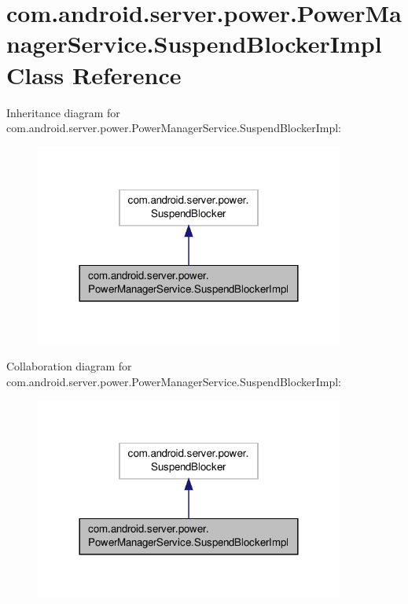 \hypertarget{classcom_1_1android_1_1server_1_1power_1_1PowerManagerService_1_1SuspendBlockerImpl}{\section{com.\-android.\-server.\-power.\-Power\-Manager\-Service.\-Suspend\-Blocker\-Impl Class Reference}
\label{classcom_1_1android_1_1server_1_1power_1_1PowerManagerService_1_1SuspendBlockerImpl}
}


Inheritance diagram for com.\-android.\-server.\-power.\-Power\-Manager\-Service.\-Suspend\-Blocker\-Impl\-:
\nopagebreak
\begin{figure}[H]
\begin{center}
\leavevmode
\includegraphics[width=288pt]{classcom_1_1android_1_1server_1_1power_1_1PowerManagerService_1_1SuspendBlockerImpl__inherit__graph}
\end{center}
\end{figure}


Collaboration diagram for com.\-android.\-server.\-power.\-Power\-Manager\-Service.\-Suspend\-Blocker\-Impl\-:
\nopagebreak
\begin{figure}[H]
\begin{center}
\leavevmode
\includegraphics[width=288pt]{classcom_1_1android_1_1server_1_1power_1_1PowerManagerService_1_1SuspendBlockerImpl__coll__graph}
\end{center}
\end{figure}
